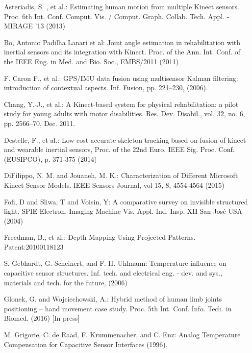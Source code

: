 \documentclass{llncs}
\begin{document}
		
\begin{thebibliography}{5}
	
		
	Asteriadis, S. , et al.:
	Estimating human motion from multiple Kinect sensors.
	Proc. 6th Int. Conf. Comput. Vis. / Comput. Graph. Collab. Tech. Appl. - MIRAGE '13 (2013)
			
	Bo, Antonio Padilha Lanari et al:
	Joint angle estimation in rehabilitation with inertial sensors and its integration with Kinect.
	Proc. of the Ann. Int. Conf. of the IEEE Eng. in Med. and Bio. Soc., EMBS/2011 (2011)
			
	F. Caron F., et al.: 
	GPS/IMU data fusion using multisensor Kalman filtering: introduction of contextual aspects. 
	Inf. Fusion, pp. 221–230, (2006).
				
	Chang, Y.-J., et al.:
	A Kinect-based system for physical rehabilitation: a pilot study for young adults with motor disabilities.
	Res. Dev. Disabil., vol. 32, no. 6, pp. 2566–70, Dec. 2011.
				
	Destelle, F., et al.: Low-cost accurate skeleton tracking based on fusion of kinect and wearable inertial sensors,
	Proc. of the 22nd Euro. IEEE Sig. Proc. Conf. (EUSIPCO), p. 371-375 (2014)
	
	DiFilippo, N. M. and Jouaneh, M. K.:
	Characterization of Different Microsoft Kinect Sensor Models.
	IEEE Sensors Journal, vol 15, 8, 4554-4564 (2015)
				
	Fofi, D and Sliwa, T and Voisin, Y:
	A comparative survey on invisible structured light.
	SPIE Electron. Imaging Machine Vis. Appl. Ind. Insp. XII San Jos{\'{e}} USA (2004)
				
	Freedman, B., et al.:
	Depth Mapping Using Projected Patterns.
	Patent:20100118123
				
	S. Gebhardt, G. Scheinert, and F. H. Uhlmann:
	Temperature influence on capacitive sensor structures.
	Inf. tech. and electrical eng. - dev. and sys., materials and tech. for the future, (2006)
		
	Glonek, G. and Wojciechowski, A.:
	Hybrid method of human limb joints positioning -- hand movement case study.
	Proc. 5th Int. Conf. Info. Tech. in Biomed. (2016) [In press]
		
	M. Grigorie, C. de Raad, F. Krummenacher, and C. Enz:
	Analog Temperature Compensation for Capacitive Sensor Interfaces (1996).
			

\end{thebibliography}
\end{document}

